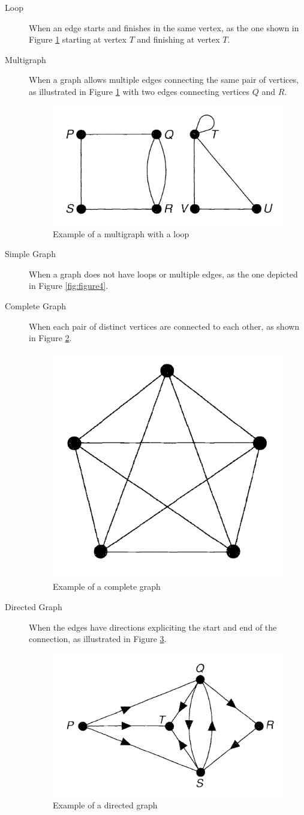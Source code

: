 \begin{description}
\item[Loop] When an edge starts and finishes in the same vertex, as the one shown in Figure \ref{fig:figure6} starting at vertex $T$ and finishing at vertex $T$.
\item[Multigraph] When a graph allows multiple edges connecting the same pair of vertices, as illustrated in Figure \ref{fig:figure6} with two edges connecting vertices $Q$ and $R$.

\begin{figure}[ht]
\centering
\includegraphics[width=.4\textwidth]{../loop_multigraph_example.png}
\caption{Example of a multigraph with a loop \cite{Tobergte2013}}
\label{fig:figure6}
\end{figure}

\item[Simple Graph] When a graph does not have loops or multiple edges, as the one depicted in Figure \ref{fig:figure4}.
\item[Complete Graph] When each pair of distinct vertices are connected to each other, as shown in Figure \ref{fig:figure7}.

\begin{figure}[ht]
\centering
\includegraphics[width=.25\textwidth]{../complete_graph_example.png}
\caption{Example of a complete graph \cite{Tobergte2013}}
\label{fig:figure7}
\end{figure}

\item[Directed Graph] When the edges have directions expliciting the start and end of the connection, as illustrated in Figure \ref{fig:figure8}.

\begin{figure}[ht]
\centering
\includegraphics[width=.4\textwidth]{../directed_graph_example.png}
\caption{Example of a directed graph \cite{Tobergte2013}}
\label{fig:figure8}
\end{figure}


\end{description}
